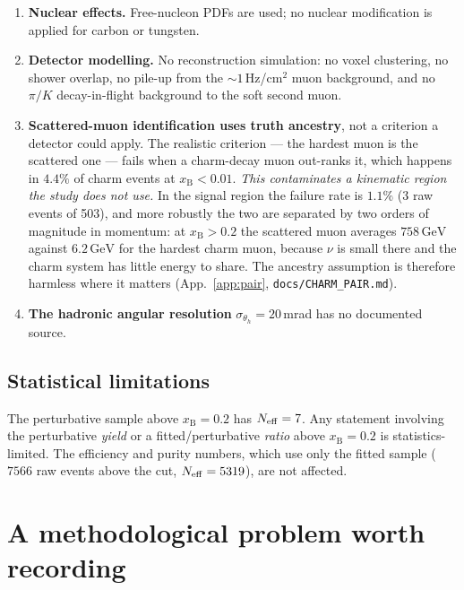 \documentclass[11pt,a4paper]{article}
\newcommand{\xB}{x_{\mathrm{B}}}
\newcommand{\thh}{\theta_{h}}
\newcommand{\GeV}{\,\mathrm{GeV}}
\begin{document}
\begin{enumerate}
        Pumplin--Lai--Tung parametrisation used above was taken from a summary
        of Ref.~\cite{lykasov} rather than read off the paper's own figures. The
        numbers should be checked against Figs.~2--3 of that reference before
        being quoted.
  \item \textbf{Nuclear effects.} Free-nucleon PDFs are used; no nuclear
        modification is applied for carbon or tungsten.
  \item \textbf{Detector modelling.} No reconstruction simulation: no voxel
        clustering, no shower overlap, no pile-up from the $\sim1$\,Hz/cm$^2$
        muon background, and no $\pi/K$ decay-in-flight background to the soft
        second muon.
  \item \textbf{Scattered-muon identification uses truth ancestry}, not a
        criterion a detector could apply. The realistic criterion --- the hardest
        muon is the scattered one --- fails when a charm-decay muon out-ranks it,
        which happens in $4.4\%$ of charm events at $\xB<0.01$. \emph{This
        contaminates a kinematic region the study does not use.} In the signal
        region the failure rate is $1.1\%$ (3 raw events of 503), and more
        robustly the two are separated by two orders of magnitude in momentum: at
        $\xB>0.2$ the scattered muon averages $758\GeV$ against $6.2\GeV$ for the
        hardest charm muon, because $\nu$ is small there and the charm system has little energy
        to share. The ancestry assumption is therefore harmless where it matters
        (App.~\ref{app:pair}, \texttt{docs/CHARM\_PAIR.md}).
  \item \textbf{The hadronic angular resolution} $\sigma_{\thh}=20\,$mrad has no
        documented source.
\end{enumerate}

\subsection{Statistical limitations}
The perturbative sample above $\xB=0.2$ has $N_{\rm eff}=7$. Any statement
involving the perturbative \emph{yield} or a fitted/perturbative \emph{ratio}
above $\xB=0.2$ is statistics-limited. The efficiency and purity numbers, which
use only the fitted sample ($7566$ raw events above the cut, $N_{\rm eff}=5319$),
are not affected.

\section{A methodological problem worth recording}
\label{sec:hadsys}
\end{document}
